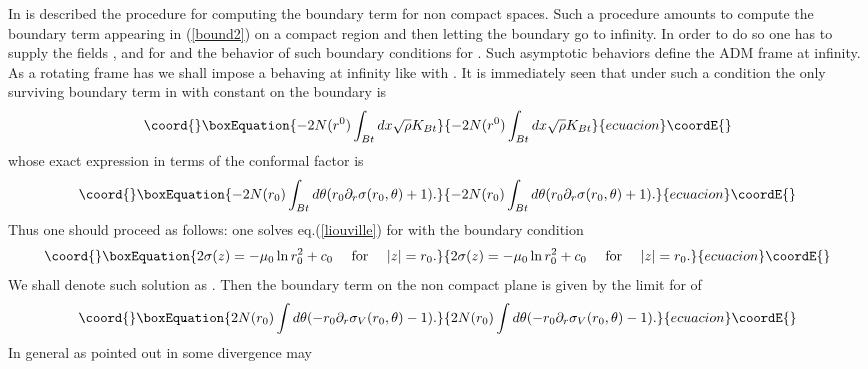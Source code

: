 \documentclass[a4paper,12pt]{article}
\begin{document}
In \cite{hawkinghunter} is described the procedure  for computing the
boundary term for non compact spaces. Such a procedure amounts to
compute 
the boundary term appearing in (\ref{bound2}) on a compact region and then
letting the boundary go to infinity. In order to do so one
has to supply the fields \coordHE{}, \coordHE{} and \myHighlight{$\sigma$}\coordHE{} for \coordHE{} and the
behavior of such boundary conditions for \coordHE{}.
Such asymptotic behaviors define the ADM frame at infinity. As a
rotating frame has \coordHE{} we shall impose a \coordHE{} behaving at
infinity like \coordHE{} with \coordHE{}. It is immediately seen
\cite{CMS1} that under such a condition the only surviving boundary
term in \coordHE{} with \coordHE{} constant on the boundary is
\begin{equation}\coord{}\boxEquation{
- 2N(r^0)\int_{Bt}  dx \sqrt{\rho} K_{Bt}
}{
- 2N(r^0)\int_{Bt}  dx \sqrt{\rho} K_{Bt}
}{ecuacion}\coordE{}\end{equation}
whose exact expression in terms of the conformal factor is \cite{CMS1}
\begin{equation}\coord{}\boxEquation{
-2 N(r_0) \int_{Bt} d\theta  (r_0 \partial_r\sigma(r_0,\theta)+1).
}{
-2 N(r_0) \int_{Bt} d\theta  (r_0 \partial_r\sigma(r_0,\theta)+1).
}{ecuacion}\coordE{}\end{equation}
Thus one should proceed as follows: one solves eq.(\ref{liouville})
for \coordHE{} with the boundary condition  
\begin{equation}\coord{}\boxEquation{\label{boundcond}
2\sigma (z) = -\mu_0\ln r^2_0 + c_0 ~~~~{\rm for}~~~~|z|=r_0.
}{2\sigma (z) = -\mu_0\ln r^2_0 + c_0 ~~~~{\rm for}~~~~|z|=r_0.
}{ecuacion}\coordE{}\end{equation}
 We shall denote such solution as
\coordHE{}. Then the boundary term on the non compact plane is given by 
the limit for \coordHE{} of
\begin{equation}\coord{}\boxEquation{\label{boundterm}
2 N(r_0) \int d\theta (-r_0 \partial_r\sigma_V(r_0,\theta)-1). 
}{2 N(r_0) \int d\theta (-r_0 \partial_r\sigma_V(r_0,\theta)-1). 
}{ecuacion}\coordE{}\end{equation}
In general as pointed out in \cite{hawkinghunter} some divergence may
\end{document}
